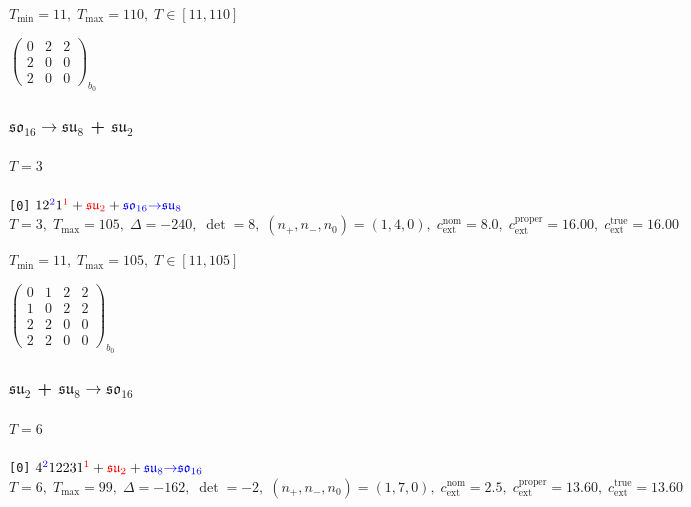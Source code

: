 \documentclass[10pt]{article}
\begin{document}
\hspace{1em}$T_{\min}=11,\;T_{\max}=110,\;T\in[11,110]$

\hspace{2em}$\left(\begin{smallmatrix}0 & 2 & 2 \\ 2 & 0 & 0 \\ 2 & 0 & 0\end{smallmatrix}\right)_{\!b_0}$


\subsubsection*{$\mathfrak{so}_{16}{\to}\mathfrak{su}_8$ + $\mathfrak{su}_2$}

\paragraph{$T=3$}

\texttt{[0]} $12^{\textcolor{blue}{2}}1^{\textcolor{red}{1}} + \textcolor{red}{\mathfrak{su}_2} + \textcolor{blue}{\mathfrak{so}_{16}{\to}\mathfrak{su}_8}$ \quad $T=3,\;T_{\max}=105,\;\Delta=-240,\;\det=8,\;(n_+,n_-,n_0)=(1,4,0),\;c_\mathrm{ext}^{\mathrm{nom}}=8.0,\;c_\mathrm{ext}^{\mathrm{proper}}=16.00,\;c_\mathrm{ext}^{\mathrm{true}}=16.00$

\hspace{1em}$T_{\min}=11,\;T_{\max}=105,\;T\in[11,105]$

\hspace{2em}$\left(\begin{smallmatrix}0 & 1 & 2 & 2 \\ 1 & 0 & 2 & 2 \\ 2 & 2 & 0 & 0 \\ 2 & 2 & 0 & 0\end{smallmatrix}\right)_{\!b_0}$


\subsubsection*{$\mathfrak{su}_2$ + $\mathfrak{su}_8{\to}\mathfrak{so}_{16}$}

\paragraph{$T=6$}

\texttt{[0]} $4^{\textcolor{blue}{2}}12231^{\textcolor{red}{1}} + \textcolor{red}{\mathfrak{su}_2} + \textcolor{blue}{\mathfrak{su}_8{\to}\mathfrak{so}_{16}}$ \quad $T=6,\;T_{\max}=99,\;\Delta=-162,\;\det=-2,\;(n_+,n_-,n_0)=(1,7,0),\;c_\mathrm{ext}^{\mathrm{nom}}=2.5,\;c_\mathrm{ext}^{\mathrm{proper}}=13.60,\;c_\mathrm{ext}^{\mathrm{true}}=13.60$
\end{document}
